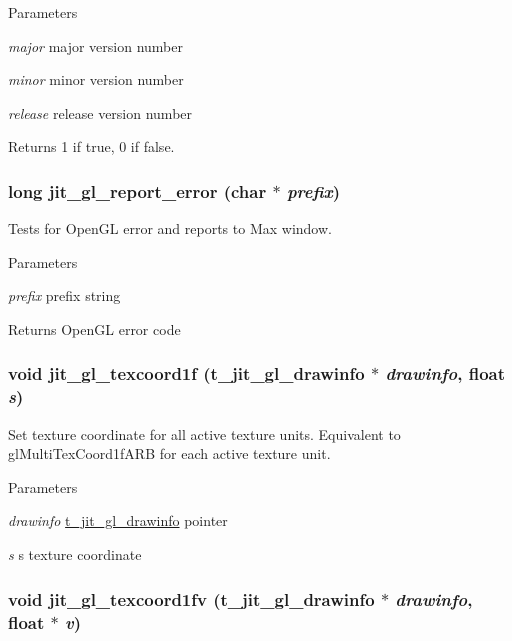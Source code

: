 \begin{DoxyParams}{Parameters}
\item[{\em major}]major version number \item[{\em minor}]minor version number \item[{\em release}]release version number\end{DoxyParams}
\begin{DoxyReturn}{Returns}
1 if true, 0 if false. 
\end{DoxyReturn}
\hypertarget{group__ob3dmod_gad8a6b7497c6c377d4ab1a740d9abbc26}{
\subsubsection[{jit\_\-gl\_\-report\_\-error}]{\setlength{\rightskip}{0pt plus 5cm}long jit\_\-gl\_\-report\_\-error (char $\ast$ {\em prefix})}}
\label{group__ob3dmod_gad8a6b7497c6c377d4ab1a740d9abbc26}


Tests for OpenGL error and reports to Max window. 
\begin{DoxyParams}{Parameters}
\item[{\em prefix}]prefix string\end{DoxyParams}
\begin{DoxyReturn}{Returns}
OpenGL error code 
\end{DoxyReturn}
\hypertarget{group__ob3dmod_ga20352984f84477063544e3f2fa63dd78}{
\subsubsection[{jit\_\-gl\_\-texcoord1f}]{\setlength{\rightskip}{0pt plus 5cm}void jit\_\-gl\_\-texcoord1f ({\bf t\_\-jit\_\-gl\_\-drawinfo} $\ast$ {\em drawinfo}, \/  float {\em s})}}
\label{group__ob3dmod_ga20352984f84477063544e3f2fa63dd78}


Set texture coordinate for all active texture units. Equivalent to glMultiTexCoord1fARB for each active texture unit.


\begin{DoxyParams}{Parameters}
\item[{\em drawinfo}]\hyperlink{structt__jit__gl__drawinfo}{t\_\-jit\_\-gl\_\-drawinfo} pointer \item[{\em s}]s texture coordinate \end{DoxyParams}
\hypertarget{group__ob3dmod_ga452b4eb8363d573bf58970b0a035f9e2}{
\subsubsection[{jit\_\-gl\_\-texcoord1fv}]{\setlength{\rightskip}{0pt plus 5cm}void jit\_\-gl\_\-texcoord1fv ({\bf t\_\-jit\_\-gl\_\-drawinfo} $\ast$ {\em drawinfo}, \/  float $\ast$ {\em v})}}
\label{group__ob3dmod_ga452b4eb8363d573bf58970b0a035f9e2}


